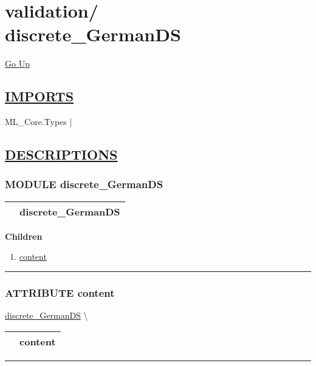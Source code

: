 \chapter*{\color{headfile}
{\large validation\slash\hspace{0pt}}
 \\
discrete_GermanDS
}
\hypertarget{ecldoc:toc:validation.discrete_GermanDS}{}
\hyperlink{ecldoc:toc:root/validation}{Go Up}

\section*{\underline{\textsf{IMPORTS}}}
\begin{doublespace}
{\large
ML\_Core.Types |
}
\end{doublespace}

\section*{\underline{\textsf{DESCRIPTIONS}}}
\subsection*{\textsf{\colorbox{headtoc}{\color{white} MODULE}
discrete\_GermanDS}}

\hypertarget{ecldoc:validation.discrete_GermanDS}{}

{\renewcommand{\arraystretch}{1.5}
\begin{tabularx}{\textwidth}{|>{\raggedright\arraybackslash}l|X|}
\hline
\hspace{0pt}\mytexttt{\color{red} } & \textbf{discrete\_GermanDS} \\
\hline
\end{tabularx}
}

\par


\textbf{Children}
\begin{enumerate}
\item \hyperlink{ecldoc:validation.discrete_germands.content}{content}
\end{enumerate}

\rule{\linewidth}{0.5pt}

\subsection*{\textsf{\colorbox{headtoc}{\color{white} ATTRIBUTE}
content}}

\hypertarget{ecldoc:validation.discrete_germands.content}{}
\hspace{0pt} \hyperlink{ecldoc:validation.discrete_GermanDS}{discrete_GermanDS} \textbackslash 

{\renewcommand{\arraystretch}{1.5}
\begin{tabularx}{\textwidth}{|>{\raggedright\arraybackslash}l|X|}
\hline
\hspace{0pt}\mytexttt{\color{red} } & \textbf{content} \\
\hline
\end{tabularx}
}

\par


\rule{\linewidth}{0.5pt}


